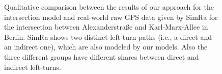 \begin{figure}
    \centering
    \hfill
    \hfill
    \caption{%
        Qualitative comparison between the results of our approach for the intersection model and real-world raw GPS data given by SimRa for the intersection between Alexanderstraße and Karl-Marx-Allee in Berlin.
        SimRa shows two distinct left-turn paths (i.e., a direct and an indirect one), which are also modeled by our models.
        Also the three different groups have different shares between direct and indirect left-turns.
    }%
    \label{fig:eval_im_traj_new}
\end{figure}

